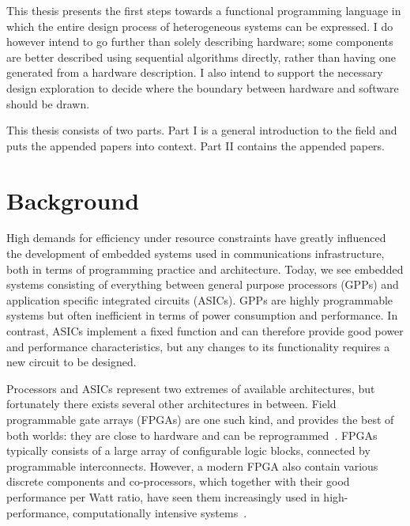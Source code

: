 This thesis presents the first steps towards a functional programming language in which the entire design process of heterogeneous systems can be expressed. I do however intend to go further than solely describing hardware; some components are better described using sequential algorithms directly, rather than having one generated from a hardware description. I also intend to support the necessary design exploration to decide where the boundary between hardware and software should be drawn. 

This thesis consists of two parts. Part I is a general introduction to the field and puts the appended papers into context. Part II contains the appended papers.


\section{Background}
\label{background}

High demands for efficiency under resource constraints have greatly influenced the development of embedded systems used in communications infrastructure, both in terms of programming practice and architecture. Today, we see embedded systems consisting of everything between general purpose processors (GPPs) and application specific integrated circuits (ASICs). GPPs are highly programmable systems but often inefficient in terms of power consumption and performance. In contrast, ASICs implement a fixed function and can therefore provide good power and performance characteristics, but any changes to its functionality requires a new circuit to be designed. 

Processors and ASICs represent two extremes of available architectures, but fortunately there exists several other architectures in between. Field programmable gate arrays (FPGAs) are one such kind, and provides the best of both worlds: they are close to hardware and can be reprogrammed~\cite{bacon2013}. FPGAs typically consists of a large array of configurable logic blocks, connected by programmable interconnects. However, a modern FPGA also contain various discrete components and co-processors, which together with their good performance per Watt ratio, have seen them increasingly used in high-performance, computationally intensive systems~\cite{mcmillan2014}.


